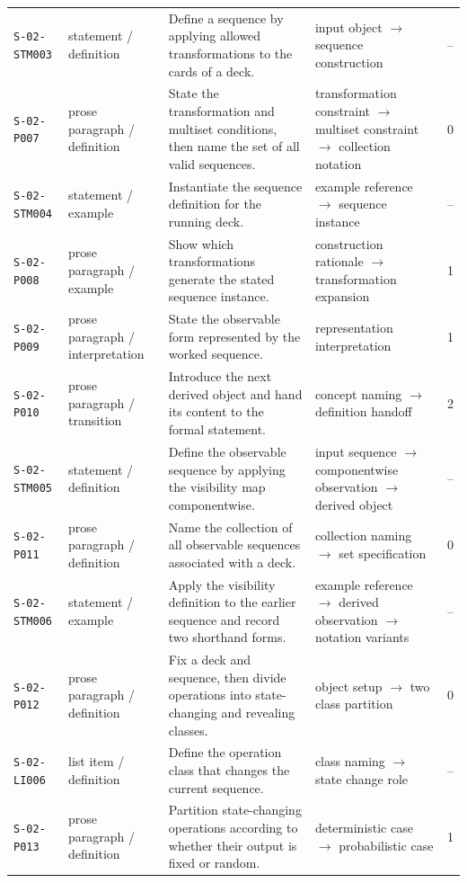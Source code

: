 \documentclass[10pt]{article}
\begin{document}
\begin{longtable}{@{}p{}p{}p{}p{}p{}@{}}
\texttt{S-02-STM003}&statement / definition&Define a sequence by applying allowed transformations to the cards of a deck.&input object $\rightarrow$ sequence construction&--\\
\texttt{S-02-P007}&prose paragraph / definition&State the transformation and multiset conditions, then name the set of all valid sequences.&transformation constraint $\rightarrow$ multiset constraint $\rightarrow$ collection notation&0\\
\texttt{S-02-STM004}&statement / example&Instantiate the sequence definition for the running deck.&example reference $\rightarrow$ sequence instance&--\\
\texttt{S-02-P008}&prose paragraph / example&Show which transformations generate the stated sequence instance.&construction rationale $\rightarrow$ transformation expansion&1\\
\texttt{S-02-P009}&prose paragraph / interpretation&State the observable form represented by the worked sequence.&representation interpretation&1\\
\texttt{S-02-P010}&prose paragraph / transition&Introduce the next derived object and hand its content to the formal statement.&concept naming $\rightarrow$ definition handoff&2\\
\texttt{S-02-STM005}&statement / definition&Define the observable sequence by applying the visibility map componentwise.&input sequence $\rightarrow$ componentwise observation $\rightarrow$ derived object&--\\
\texttt{S-02-P011}&prose paragraph / definition&Name the collection of all observable sequences associated with a deck.&collection naming $\rightarrow$ set specification&0\\
\texttt{S-02-STM006}&statement / example&Apply the visibility definition to the earlier sequence and record two shorthand forms.&example reference $\rightarrow$ derived observation $\rightarrow$ notation variants&--\\
\texttt{S-02-P012}&prose paragraph / definition&Fix a deck and sequence, then divide operations into state-changing and revealing classes.&object setup $\rightarrow$ two class partition&0\\
\texttt{S-02-LI006}&list item / definition&Define the operation class that changes the current sequence.&class naming $\rightarrow$ state change role&--\\
\texttt{S-02-P013}&prose paragraph / definition&Partition state-changing operations according to whether their output is fixed or random.&deterministic case $\rightarrow$ probabilistic case&1\\

\end{longtable}
\end{document}
